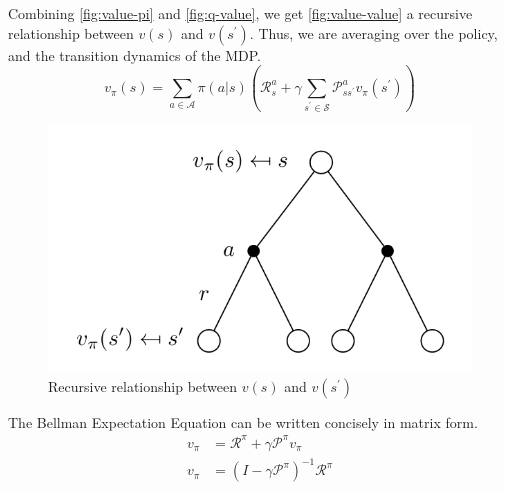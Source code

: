 Combining \autoref{fig:value-pi} and \autoref{fig:q-value}, 
we get \autoref{fig:value-value} a recursive relationship between \(v(s)\) and \(v(s^{\prime} )\).
Thus, we are averaging over the policy, and the transition dynamics of the MDP.
\[
    v_\pi (s) = \sum_{a \in \mathcal{A} } \pi (a|s) \left( 
        \mathcal{R} _{s}^{a} + \gamma \sum_{s^{\prime} \in \mathcal{S} 
        } \mathcal{P} _{ss^{\prime}}^{a} v_\pi (s^{\prime} ) \right)  
\]
\begin{figure}
    \centering
    \includegraphics[width=0.5\linewidth]{figures/value-value.png}
    \caption{Recursive relationship between \(v(s)\) and \(v(s^{\prime} )\)}
    \label{fig:value-value}
\end{figure}

The Bellman Expectation Equation can be written concisely in matrix form.
\[
    \begin{aligned}
        v_{\pi} &= \mathcal{R} ^{\pi} + \gamma \mathcal{P} ^{\pi} v_{\pi}  \\
        v_{\pi} &= \left( 
            I - \gamma \mathcal{P} ^{\pi}
         \right) ^{-1} \mathcal{R} ^{\pi}  \\
    \end{aligned}
\]

